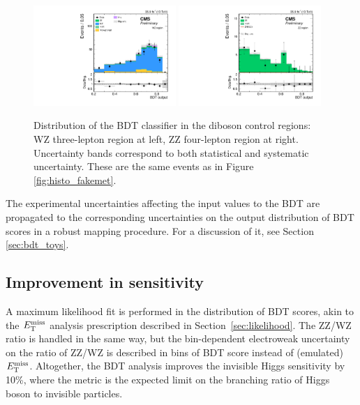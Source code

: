 \begin{figure}[htbp]
\begin{center}
\includegraphics[width=0.48\textwidth]{figures/fullsel_bdt_wz_postfit.pdf}
\includegraphics[width=0.48\textwidth]{figures/fullsel_bdt_zz_postfit.pdf}
\caption{Distribution of the BDT classifier in the diboson control regions: WZ three-lepton region at left, ZZ four-lepton region at right. Uncertainty bands correspond to both statistical and systematic uncertainty. 
These are the same events as in Figure \ref{fig:histo_fakemet}.}
\label{fig:bdt_vv}
\end{center}
\end{figure}
\clearpage

The experimental uncertainties affecting the input values to the BDT are propagated to
the corresponding uncertainties on the output distribution of BDT scores in a robust mapping procedure.
For a discussion of it, see Section \ref{sec:bdt_toys}.

\subsection{Improvement in sensitivity} 
A maximum likelihood fit is performed in the distribution of BDT scores, akin to the $E_\mathrm{T}^{\mathrm{miss}}$ analysis prescription described in Section~\ref{sec:likelihood}.
The ZZ/WZ ratio is handled in the same way, but the bin-dependent electroweak uncertainty on the ratio of ZZ/WZ
is described in bins of BDT score instead of (emulated) $E_\mathrm{T}^{\mathrm{miss}}$.
Altogether, the BDT analysis improves the invisible Higgs sensitivity by 10\%,
where the metric is the expected limit on the branching ratio of Higgs boson to invisible particles.

